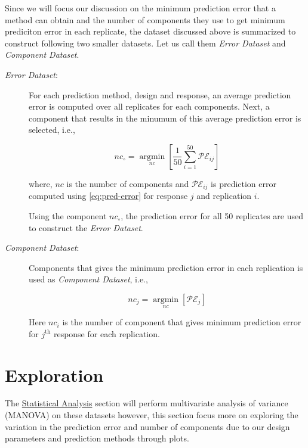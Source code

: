 \documentclass[12pt,3p,authoryear]{elsarticle}
\begin{document}

Since we will focus our discussion on the minimum prediction error that
a method can obtain and the number of components they use to get minimum
prediciton error in each replicate, the dataset discussed above is
summarized to construct following two smaller datasets. Let us call them
\emph{Error Dataset} and \emph{Component Dataset}.

\begin{description}
\item[\emph{Error Dataset}:]
For each prediction method, design and response, an average prediction
error is computed over all replicates for each components. Next, a
component that results in the minumum of this average prediction error
is selected, i.e.,

\begin{equation}
  nc_\circ = \operatorname*{argmin}_{nc}\left[\frac{1}{50}\sum_{i=1}^{50}{\mathcal{PE}_{ij}}\right]
  \label{eq:min-pred}
  \end{equation}

where, \(nc\) is the number of components and \(\mathcal{PE}_{ij}\) is
prediction error computed using \eqref{eq:pred-error} for response \(j\)
and replication \(i\).

Using the component \(nc_\circ\), the prediction error for all 50
replicates are used to construct the \emph{Error Dataset}.
\item[\emph{Component Dataset}:]
Components that gives the minimum prediction error in each replication
is used as \emph{Component Dataset}, i.e.,

\begin{equation}
  nc_j = \operatorname*{argmin}_{nc}\left[\mathcal{PE}_{j}\right]
  \label{eq:min-comp}
  \end{equation}

Here \(nc_i\) is the number of component that gives minimum prediction
error for \(j^\text{th}\) response for each replication.
\end{description}

\section{Exploration}\label{exploration}

The \protect\hyperlink{statistical-analysis}{Statistical Analysis}
section will perform multivariate analysis of variance (MANOVA)
\citep{johnson2018applied} on these datasets however, this section focus
more on exploring the variation in the prediction error and number of
components due to our design parameters and prediction methods through
plots.
\end{document}
